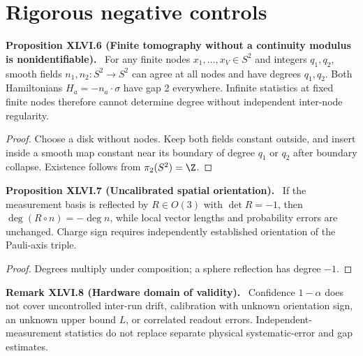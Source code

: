 \documentclass[11pt,a4paper,oneside]{book}
\newcommand{\statement}[3]{\par\medskip\noindent\textbf{#1 #2 (#3).}\ }
\begin{document}
\section{Rigorous negative controls}
\statement{Proposition}{XLVI.6}{Finite tomography without a continuity modulus is nonidentifiable}
For any finite nodes $x_1,\ldots,x_V\in S^2$ and integers $q_1,q_2$, smooth fields $n_1,n_2:S^2\to S^2$ can agree at all nodes and have degrees $q_1,q_2$. Both Hamiltonians $H_a=-n_a\cdot\sigma$ have gap 2 everywhere. Infinite statistics at fixed finite nodes therefore cannot determine degree without independent inter-node regularity.
\begin{proof}
Choose a disk without nodes. Keep both fields constant outside, and insert inside a smooth map constant near its boundary of degree $q_1$ or $q_2$ after boundary collapse. Existence follows from $\pi_2(S^2)=\Z$.
\end{proof}
\statement{Proposition}{XLVI.7}{Uncalibrated spatial orientation}
If the measurement basis is reflected by $R\in O(3)$ with $\det R=-1$, then $\deg(R\circ n)=-\deg n$, while local vector lengths and probability errors are unchanged. Charge sign requires independently established orientation of the Pauli-axis triple.
\begin{proof}
Degrees multiply under composition; a sphere reflection has degree $-1$.
\end{proof}
\statement{Remark}{XLVI.8}{Hardware domain of validity}
Confidence $1-\alpha$ does not cover uncontrolled inter-run drift, calibration with unknown orientation sign, an unknown upper bound $L$, or correlated readout errors. Independent-measurement statistics do not replace separate physical systematic-error and gap estimates.
\end{document}
